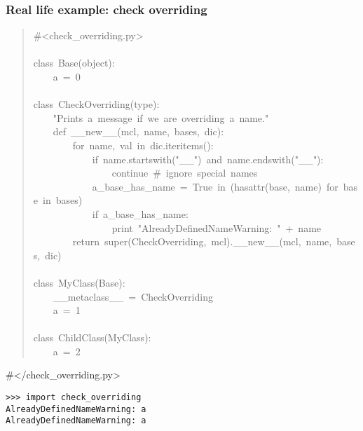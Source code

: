\documentclass[10pt,a4paper,english]{article}
\begin{document}
\subsubsection*{Real life example: check overriding}
\begin{quote}{\ttfamily \raggedright \noindent
{\#}<check{\_}overriding.py>~\\
~\\
class~Base(object):~\\
~~~~a~=~0~\\
~\\
class~CheckOverriding(type):~\\
~~~~"Prints~a~message~if~we~are~overriding~a~name."~\\
~~~~def~{\_}{\_}new{\_}{\_}(mcl,~name,~bases,~dic):~\\
~~~~~~~~for~name,~val~in~dic.iteritems():~\\
~~~~~~~~~~~~if~name.startswith("{\_}{\_}")~and~name.endswith("{\_}{\_}"):~~\\
~~~~~~~~~~~~~~~~continue~{\#}~ignore~special~names~\\
~~~~~~~~~~~~a{\_}base{\_}has{\_}name~=~True~in~(hasattr(base,~name)~for~base~in~bases)~\\
~~~~~~~~~~~~if~a{\_}base{\_}has{\_}name:~\\
~~~~~~~~~~~~~~~~print~"AlreadyDefinedNameWarning:~"~+~name~\\
~~~~~~~~return~super(CheckOverriding,~mcl).{\_}{\_}new{\_}{\_}(mcl,~name,~bases,~dic)~\\
~\\
class~MyClass(Base):~\\
~~~~{\_}{\_}metaclass{\_}{\_}~=~CheckOverriding~\\
~~~~a~=~1~\\
~\\
class~ChildClass(MyClass):~\\
~~~~a~=~2
}\end{quote}

{\#}{\textless}/check{\_}overriding.py{\textgreater}
\begin{verbatim}>>> import check_overriding
AlreadyDefinedNameWarning: a
AlreadyDefinedNameWarning: a\end{verbatim}



\hypertarget{logfile}{}
\end{document}
